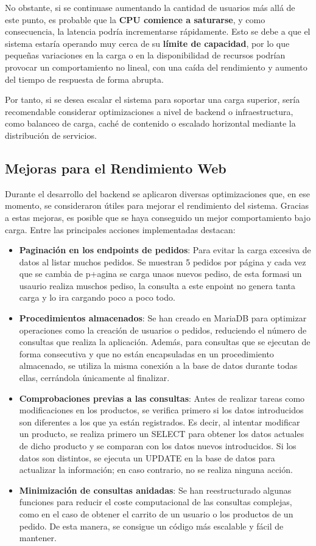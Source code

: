 \documentclass[10pt]{book}
\begin{document}
No obstante, si se continuase aumentando la cantidad de usuarios más allá de este punto, es probable que la \textbf{CPU comience a saturarse}, y como consecuencia, la latencia podría incrementarse rápidamente. Esto se debe a que el sistema estaría operando muy cerca de su \textbf{límite de capacidad}, por lo que pequeñas variaciones en la carga o en la disponibilidad de recursos podrían provocar un comportamiento no lineal, con una caída del rendimiento y aumento del tiempo de respuesta de forma abrupta.

Por tanto, si se desea escalar el sistema para soportar una carga superior, sería recomendable considerar optimizaciones a nivel de backend o infraestructura, como balanceo de carga, caché de contenido o escalado horizontal mediante la distribución de servicios.




\subsection{Mejoras para el Rendimiento Web}
Durante el desarrollo del backend se aplicaron diversas optimizaciones que, en ese momento, se consideraron útiles para mejorar el rendimiento del sistema. Gracias a estas mejoras, es posible que se haya conseguido un mejor comportamiento bajo carga. Entre las principales acciones implementadas destacan:

\begin{itemize}
    \item \textbf{Paginación en los endpoints de pedidos}: Para evitar la carga excesiva de datos al listar muchos pedidos. Se muestran 5 pedidos por página y cada vez que se cambia de p+agina se carga unaos nuevos pediso, de esta formasi un usaurio realiza muschos pediso, la consulta a este enpoint no genera tanta carga y lo ira cargando poco a poco todo.
    \item \textbf{Procedimientos almacenados}: Se han creado en MariaDB para optimizar operaciones como la creación de usuarios o pedidos, reduciendo el número de consultas que realiza la aplicación. Además, para consultas que se ejecutan de forma consecutiva y que no están encapsuladas en un procedimiento almacenado, se utiliza la misma conexión a la base de datos durante todas ellas, cerrándola únicamente al finalizar.
    \item \textbf{Comprobaciones previas a las consultas}: Antes de realizar tareas como modificaciones en los productos, se verifica primero si los datos introducidos son diferentes a los que ya están registrados. Es decir, al intentar modificar un producto, se realiza primero un SELECT para obtener los datos actuales de dicho producto y se comparan con los datos nuevos introducidos. Si los datos son distintos, se ejecuta un UPDATE en la base de datos para actualizar la información; en caso contrario, no se realiza ninguna acción.
    \item \textbf{Minimización de consultas anidadas}: Se han reestructurado algunas funciones para reducir el coste computacional de las consultas complejas, como en el caso de obtener el carrito de un usuario o los productos de un pedido. De esta manera, se consigue un código más escalable y fácil de mantener.
\end{itemize}
\end{document}
